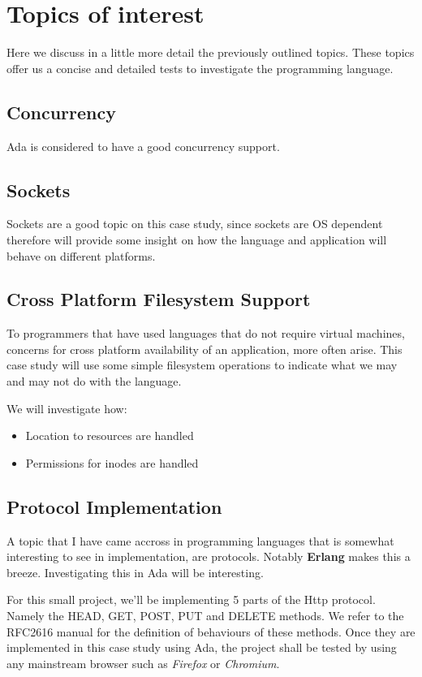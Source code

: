 \section{Topics of interest}
Here we discuss in a little more detail the previously outlined topics. These
topics offer us a concise and detailed tests to investigate the programming 
language.

\subsection{Concurrency}
Ada is considered to have a good concurrency support. 

\subsection{Sockets}
Sockets are a good topic on this case study, since sockets are OS dependent
therefore will provide some insight on how the language and application will
behave on different platforms. 

\subsection{Cross Platform Filesystem Support}
To programmers that have used languages that do not require virtual machines, 
concerns for cross platform availability of an application, more often arise. 
This case study will use some simple filesystem operations to indicate what we 
may and may not do with the language.

We will investigate how:
\begin{itemize}
  \item Location to resources are handled
  \item Permissions for inodes are handled
\end{itemize}

\subsection{Protocol Implementation}
A topic that I have came accross in programming languages that is somewhat
interesting to see in implementation, are protocols. Notably \textbf{Erlang} 
makes this a breeze. Investigating this in Ada will be interesting. 

For this small project, we'll be implementing 5 parts of the Http protocol. 
Namely the HEAD, GET, POST, PUT and DELETE methods. We refer to the RFC2616 manual \cite{RFC2616}
for the definition of behaviours of these methods. Once they are implemented in
this case study using Ada, the project shall be tested by using any mainstream 
browser such as \textit{Firefox} or \textit{Chromium}.

